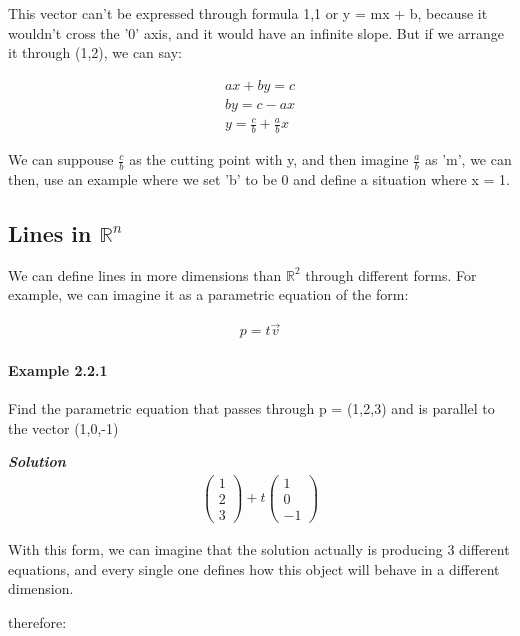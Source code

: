 \documentclass[11pt,fleqn]{book} %
\begin{document}

This vector can't be expressed through formula 1,1 or y = mx + b, because it wouldn't cross the '0' axis, and it would have an infinite slope. But if we arrange it through (1,2), we can say:

\begin{gather}
ax + by = c\\
by = c - ax\\
y = \frac{c}{b} + \frac{a}{b} x
\end{gather}


We can suppouse $\frac{c}{b}$ as the cutting point with y, and then imagine $\frac{a}{b}$ as 'm', we can then, use an example where we set 'b' to be 0
and define a situation where x = 1.

\subsection{Lines in $\mathbb{R}^n$}

We can define lines in more dimensions than $\mathbb{R}^2$
through different forms. For example, we can imagine it as a parametric equation of the form:

\begin{gather}
    p = t\vec{v}
\end{gather}

\paragraph*{Example 2.2.1}

Find the parametric equation that passes through p = (1,2,3) and is parallel to the vector (1,0,-1)

\textit{\textbf{Solution}}
\begin{gather}
    \begin{pmatrix}
        1 \\ 2 \\ 3
    \end{pmatrix} + t \begin{pmatrix}
        1 \\0 \\-1
    \end{pmatrix}
\end{gather}

With this form, we can imagine that the solution actually is producing 3 different equations, and every single one defines how this object will behave in a different dimension.

therefore:
\end{document}
